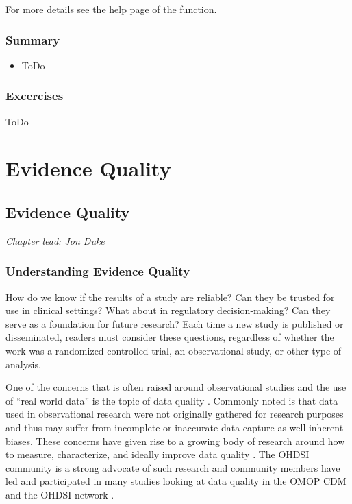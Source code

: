 \documentclass[11pt]{book}
\providecommand{\tightlist}{%
  \setlength{\itemsep}{0pt}\setlength{\parskip}{0pt}}
\theoremstyle{definition}
\theoremstyle{definition}
\theoremstyle{definition}
\theoremstyle{remark}
\let\BeginKnitrBlock\begin \let\EndKnitrBlock\end
\begin{document}
For more details see the help page of the function.

\hypertarget{summary-10}{%
\section{Summary}\label{summary-10}}

\BeginKnitrBlock{rmdsummary}
\begin{itemize}
\tightlist
\item
  ToDo
\end{itemize}
\EndKnitrBlock{rmdsummary}

\hypertarget{excercises-1}{%
\section{Excercises}\label{excercises-1}}

ToDo

\hypertarget{part-evidence-quality}{%
\part{Evidence Quality}\label{part-evidence-quality}}

\hypertarget{EvidenceQuality}{%
\chapter{Evidence Quality}\label{EvidenceQuality}}

\emph{Chapter lead: Jon Duke}

\hypertarget{understanding-evidence-quality}{%
\section{Understanding Evidence Quality}\label{understanding-evidence-quality}}

How do we know if the results of a study are reliable? Can they be trusted for use in clinical settings? What about in regulatory decision-making? Can they serve as a foundation for future research? Each time a new study is published or disseminated, readers must consider these questions, regardless of whether the work was a randomized controlled trial, an observational study, or other type of analysis.  

One of the concerns that is often raised around observational studies and the use of ``real world data'' is the topic of data quality \citep{botsis2010secondary, hersh2013caveats, sherman2016real}. Commonly noted is that data used in observational research were not originally gathered for research purposes and thus may suffer from incomplete or inaccurate data capture as well inherent biases. These concerns have given rise to a growing body of research around how to measure, characterize, and ideally improve data quality \citep{kahn2012pragmatic, liaw2013towards, weiskopf2013methods}. The OHDSI community is a strong advocate of such research and community members have led and participated in many studies looking at data quality in the OMOP CDM and the OHDSI network \citep{huser_multisite_2016, kahn_transparent_2015, callahan2017comparison, yoon_2016}.  
\end{document}
